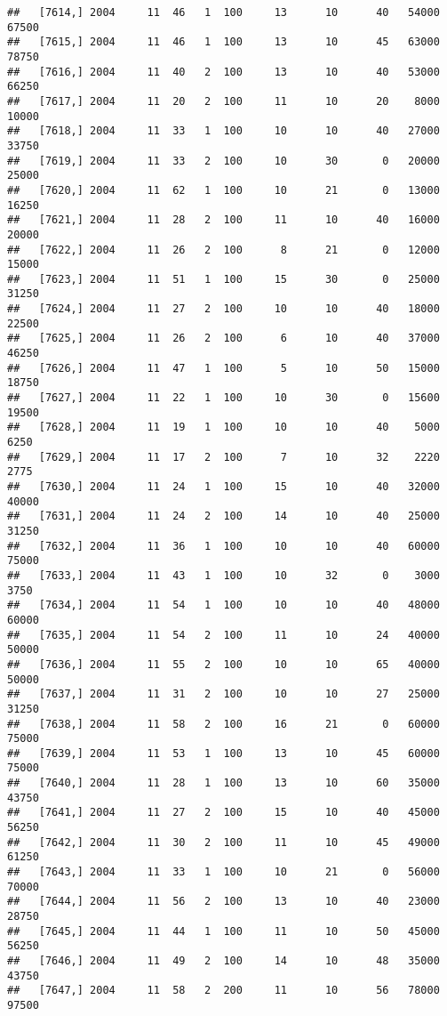 \documentclass{article}\usepackage[]{graphicx}\usepackage[]{color}
\makeatletter
\newenvironment{kframe}{%
 \def\at@end@of@kframe{}%
 \ifinner\ifhmode%
  \def\at@end@of@kframe{\end{minipage}}%
  \begin{minipage}{\columnwidth}%
 \fi\fi%
 \def\FrameCommand##1{\hskip\@totalleftmargin \hskip-\fboxsep
 \colorbox{shadecolor}{##1}\hskip-\fboxsep
     \hskip-\linewidth \hskip-\@totalleftmargin \hskip\columnwidth}%
 \MakeFramed {\advance\hsize-\width
   \@totalleftmargin\z@ \linewidth\hsize
   \@setminipage}}%
 {\par\unskip\endMakeFramed%
 \at@end@of@kframe}
\newenvironment{knitrout}{}{} %
\makeatother
\begin{document}
\begin{knitrout}
\begin{kframe}
\begin{verbatim}
##   [7614,] 2004     11  46   1  100     13      10      40   54000   67500
##   [7615,] 2004     11  46   1  100     13      10      45   63000   78750
##   [7616,] 2004     11  40   2  100     13      10      40   53000   66250
##   [7617,] 2004     11  20   2  100     11      10      20    8000   10000
##   [7618,] 2004     11  33   1  100     10      10      40   27000   33750
##   [7619,] 2004     11  33   2  100     10      30       0   20000   25000
##   [7620,] 2004     11  62   1  100     10      21       0   13000   16250
##   [7621,] 2004     11  28   2  100     11      10      40   16000   20000
##   [7622,] 2004     11  26   2  100      8      21       0   12000   15000
##   [7623,] 2004     11  51   1  100     15      30       0   25000   31250
##   [7624,] 2004     11  27   2  100     10      10      40   18000   22500
##   [7625,] 2004     11  26   2  100      6      10      40   37000   46250
##   [7626,] 2004     11  47   1  100      5      10      50   15000   18750
##   [7627,] 2004     11  22   1  100     10      30       0   15600   19500
##   [7628,] 2004     11  19   1  100     10      10      40    5000    6250
##   [7629,] 2004     11  17   2  100      7      10      32    2220    2775
##   [7630,] 2004     11  24   1  100     15      10      40   32000   40000
##   [7631,] 2004     11  24   2  100     14      10      40   25000   31250
##   [7632,] 2004     11  36   1  100     10      10      40   60000   75000
##   [7633,] 2004     11  43   1  100     10      32       0    3000    3750
##   [7634,] 2004     11  54   1  100     10      10      40   48000   60000
##   [7635,] 2004     11  54   2  100     11      10      24   40000   50000
##   [7636,] 2004     11  55   2  100     10      10      65   40000   50000
##   [7637,] 2004     11  31   2  100     10      10      27   25000   31250
##   [7638,] 2004     11  58   2  100     16      21       0   60000   75000
##   [7639,] 2004     11  53   1  100     13      10      45   60000   75000
##   [7640,] 2004     11  28   1  100     13      10      60   35000   43750
##   [7641,] 2004     11  27   2  100     15      10      40   45000   56250
##   [7642,] 2004     11  30   2  100     11      10      45   49000   61250
##   [7643,] 2004     11  33   1  100     10      21       0   56000   70000
##   [7644,] 2004     11  56   2  100     13      10      40   23000   28750
##   [7645,] 2004     11  44   1  100     11      10      50   45000   56250
##   [7646,] 2004     11  49   2  100     14      10      48   35000   43750
##   [7647,] 2004     11  58   2  200     11      10      56   78000   97500

\end{verbatim}
\end{kframe}
\end{knitrout}
\end{document}
